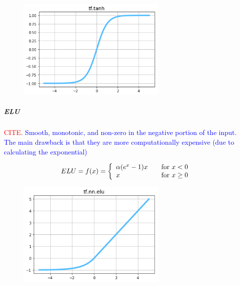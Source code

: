 \begin{figure}
	\centering
	\includegraphics[width=0.65\textwidth]{./sync_imgs/act/smooth/tangent.png}
	\label{fig:act_smooth_tangent}
\end{figure}

\subparagraph{ELU}

\textcolor{blue}{\textcolor{red}{CITE}. Smooth, monotonic, and non-zero in the negative portion of the input. The main drawback is that they are more computationally expensive (due to calculating the exponential)}


\begin{equation}
{
	ELU = f(x) = \left\{
	\begin{array}{ll}
	\alpha(e^x - 1) x & \quad $for$ \ x < 0 \\
	x & \quad $for$ \ x \ge 0
	\end{array}
	\right.
}
\label{eq:act_elu_def}
\end{equation}


\begin{figure}
	\centering
	\includegraphics[width=0.65\textwidth]{./sync_imgs/act/smooth/elu.png}
	\label{fig:act_smooth_elu}
\end{figure}

